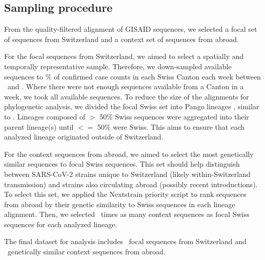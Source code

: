 \documentclass[9pt,twoside,lineno]{pnas-new} %
\newcommand{\maxsamplingpercent}{\maxsamplingfraction*100}
\begin{document}
\subsection*{Sampling procedure}

From the quality-filtered alignment of GISAID sequences, we selected a focal set of sequences from Switzerland and a context set of sequences from abroad. 

For the focal sequences from Switzerland, we aimed to select a spatially and temporally representative sample. Therefore, we down-sampled available sequences to \fpeval{\maxsamplingpercent}\% of confirmed case counts in each Swiss Canton each week between \mindate\ and \maxdate. Where there were not enough sequences available from a Canton in a week, we took all available sequences. To reduce the size of the alignments for phylogenetic analysis, we divided the focal Swiss set into Pango lineages \cite{Rambaut}, similar to \cite{DuPlessis2021}. Lineages composed of $>$ 50\% Swiss sequences were aggregated into their parent lineage(s) until $<=$ 50\% were Swiss. This aims to ensure that each analyzed lineage originated outside of Switzerland.

For the context sequences from abroad, we aimed to select the most genetically similar sequences to focal Swiss sequences. This set should help distinguish between SARS-CoV-2 strains unique to Switzerland (likely within-Switzerland transmission) and strains also circulating abroad (possibly recent introductions). To select this set, we applied the Nextstrain priority script \cite{Nextstrain} to rank sequences from abroad by their genetic similarity to Swiss sequences in each lineage alignment. Then, we selected \similaritycontextscalefactor\ times as many  context sequences as focal Swiss sequences for each analyzed lineage. 

The final dataset for analysis includes \nfocalsamples\ focal sequences from Switzerland and \nsimcontext\ genetically similar context sequences from abroad.
\end{document}
